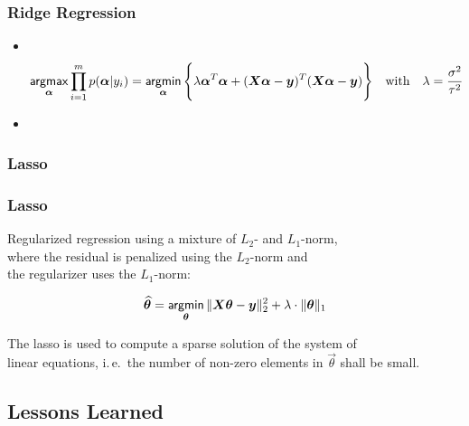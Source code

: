 \begin{frame}
	\frametitle{Ridge Regression \cont}

	\begin{itemize}
		\item {} \\[.25cm]
		      {\footnotesize
		      \begin{displaymath}
			      \mathop{\mathsf{argmax}}_{{\bm \alpha}} \prod_{i=1}^m p({\bm \alpha}|y_i)
			      = \mathop{\mathsf{argmin}}_{{\bm \alpha}} \Bigg\{ \lambda {\bm \alpha}^T {\bm \alpha} + ({\bm X}{\bm \alpha} - {\bm y})^T ({\bm X}{\bm \alpha} - {\bm y}) \Bigg\}
			      \quad \text{with} \quad
			      \lambda = \frac{\sigma^2}{\tau^2}
		      \end{displaymath}
		      }
		      \vspace{.25cm} \pause
		\item {}
	\end{itemize}
\end{frame}


\subsubsection{Lasso}

\begin{frame}
	\frametitle{Lasso}
	Regularized regression using a mixture of $L_2$- and $L_1$-norm, \\
	where the residual is penalized using the $L_2$-norm and \\
	the regularizer uses the $L_1$-norm:

	\begin{displaymath}
		\widehat{{\bm \theta}} = \mathop{\mathsf{argmin}}_{{\bm \theta}} \|{\bm X}{\bm \theta}-{\bm y}\|^2_2 + \lambda \cdot \|{\bm \theta}\|_1
	\end{displaymath}
	\pause

	The lasso is used to compute a sparse solution of the system of \\
	linear equations, i.\,e.\ the number of non-zero elements in $\vec \theta$ shall be small.
\end{frame}


\subsection{Lessons Learned}

